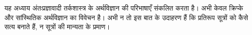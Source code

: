 \documentclass[../../../include/open-logic-chapter]{subfiles}
\begin{document}

\begin{editorial}
  यह अध्याय अंतःप्रज्ञावादी तर्कशास्त्र के अर्थविज्ञान की परिभाषाएँ संकलित
  करता है। अभी केवल क्रिप्के और सांस्थितिक अर्थविज्ञान का विवेचन है। अभी न
  तो इस बात के उदाहरण हैं कि प्रतिरूप सूत्रों को कैसे सत्य बनाते हैं, न
  सूत्रों की मान्यता के प्रमाण।
\end{editorial}


\OLEndChapterHook
\end{document}
